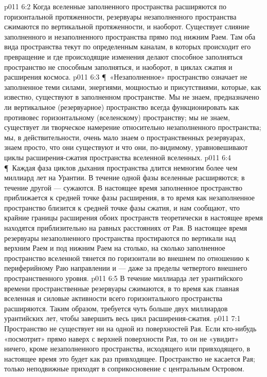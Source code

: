 \vs p011 6:2 Когда вселенные заполненного пространства расширяются по горизонтальной протяженности, резервуары незаполненного пространства сжимаются по вертикальной протяженности, и наоборот. Существует слияние заполненного и незаполненного пространства прямо под нижним Раем. Там оба вида пространства текут по определенным каналам, в которых происходит его превращение и где происходящие изменения делают способное заполняться пространство не способным заполняться, и наоборот, в циклах сжатия и расширения космоса.
\vs p011 6:3 \P\ «Незаполненное» пространство означает не заполненное теми силами, энергиями, мощностью и присутствиями, которые, как известно, существуют в заполненном пространстве. Мы не знаем, предназначено ли вертикальное (резервуарное) пространство всегда функционировать как противовес горизонтальному (вселенскому) пространству; мы не знаем, существует ли творческое намерение относительно незаполненного пространства; мы, в действительности, очень мало знаем о пространственных резервуарах, знаем просто, что они существуют и что они, по\hyp{}видимому, уравновешивают циклы расширения\hyp{}сжатия пространства вселенной вселенных.
\vs p011 6:4 \P\ Каждая фаза циклов дыхания пространства длится немногим более чем миллиард лет на Урантии. В течение одной фазы вселенные расширяются; в течение другой --- сужаются. В настоящее время заполненное пространство приближается к средней точке фазы расширения, в то время как незаполненное пространство близится к средней точке фазы сжатия, и нам сообщают, что крайние границы расширения обоих пространств теоретически в настоящее время находятся приблизительно на равных расстояниях от Рая. В настоящее время резервуары незаполненного пространства простираются по вертикали над верхним Раем и под нижним Раем на столько, на сколько заполненное пространство вселенной тянется по горизонтали во внешнем по отношению к периферийному Раю направлении и --- даже за пределы четвертого внешнего пространственного уровня.
\vs p011 6:5 В течение миллиарда лет урантийского времени пространственные резервуары сжимаются, в то время как главная вселенная и силовые активности всего горизонтального пространства расширяются. Таким образом, требуется чуть больше двух миллиардов урантийских лет, чтобы завершить весь цикл расширения\hyp{}сжатия.
\vs p011 7:1 Пространство не существует ни на одной из поверхностей Рая. Если кто\hyp{}нибудь «посмотрит» прямо наверх с верхней поверхности Рая, то он не «увидит» ничего, кроме незаполненного пространства, исходящего или привходящего, в настоящее время это будет как раз привходящее. Пространство не касается Рая; только неподвижные  приходят в соприкосновение с центральным Островом.
